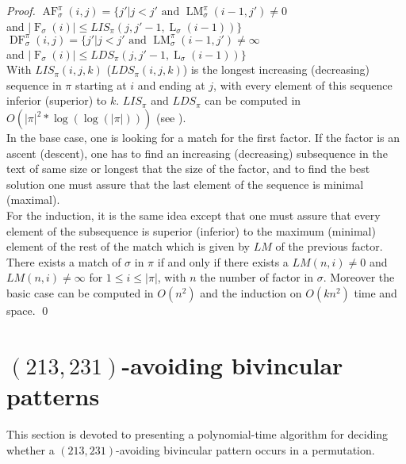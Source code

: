 \documentclass[a4paper]{llncs}
\newcommand{\ptext}{\pi}
\newcommand{\pmotif}{\sigma}
\newcounter{num}
\DeclareMathOperator{\firsta}{L}
\newcommand{\first}[2]{\firsta_{{#1}}({#2})}
\DeclareMathOperator{\factora}{F}
\newcommand{\factor}[2]{\factora_{{#1}}({#2})}
\DeclareMathOperator{\LMa}{LM}
\newcommand{\LM}[4]{\LMa_{{#1}}^{{#2}}(#3,#4)}
\DeclareMathOperator{\AFa}{AF}
\newcommand{\AF}[4]{\AFa_{{#1}}^{{#2}}(#3,#4)}
\DeclareMathOperator{\DFa}{DF}
\newcommand{\DF}[4]{\DFa_{{#1}}^{{#2}}(#3,#4)}
\begin{document}
\begin{proof}
$\AF{\pmotif}{\ptext}{i}{j}=\{j'|\text{$j<j'$ and $\LM{\pmotif}{\ptext}{i-1}{j'} \neq 0$}$ \\
\indent \indent \indent and  $|\factor{\pmotif}{i}| \leq LIS_{\ptext}(j,j'-1,\first{\pmotif}{i-1})\}$ \\

$\DF{\pmotif}{\ptext}{i}{j}=\{j'|\text{$j<j'$ and $\LM{\pmotif}{\ptext}{i-1}{j'} \neq \infty$}$ \\
\indent \indent \indent and  $|\factor{\pmotif}{i}| \leq LDS_{\ptext}(j,j'-1,\first{\pmotif}{i-1}) \}$ \\

With $LIS_{\ptext}(i,j,k)$ ($LDS_{\ptext}(i,j,k)$) is the longest increasing (decreasing) sequence in $\ptext$ starting at $i$ and ending at $j$,
with every element of this sequence
inferior (superior) to $k$.
$LIS_{\ptext}$ and $LDS_{\ptext}$ can be computed in $O(|\ptext|^2*\log(\log(|\ptext|)))$ (see \cite{Bespamyatnikh00enumeratinglongest}).\\

In the base case,
one is looking for a match for the first factor.
If the factor is an ascent (descent),
one has to find an increasing (decreasing) subsequence
in the text of same size or longest that
the size of the factor,
and to find the best solution
one must assure that the last element
of the sequence is minimal (maximal).\\
For the induction, it is the same idea
except that one must assure that
every element of the subsequence is superior (inferior)
to the maximum (minimal) element of the rest of the match which is given by $LM$ of
the previous factor.\\

There exists a match of $\pmotif$ in $\ptext$ if and only if
there exists a $LM(n,i)\neq 0$ and $LM(n,i)\neq \infty$ for $1 \leq i \leq |\ptext|$,
with $n$ the number of factor in $\pmotif$.
Moreover the basic case can be computed in $O(n^2)$
and the induction on $O(kn^2)$ time and space.
\qed
\end{proof}


\section{$(213,231)$-avoiding bivincular patterns}
	\label{section:bivincular}

		This section is devoted to presenting a polynomial-time algorithm for deciding whether
	a $(213,231)$-avoiding bivincular pattern occurs in a permutation.
\end{document}
